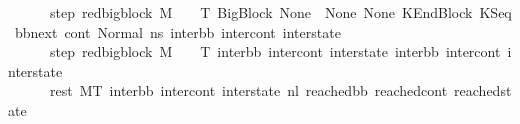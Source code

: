 \begin{isabellebody}
\ \ \ \ \ \ step{}{\isacharcolon}{\kern0pt}\ {\isachardoublequoteopen}{\isacharparenleft}{\kern0pt}red{\isacharunderscore}{\kern0pt}bigblock\ M\ {\isasymLambda}\ {\isasymGamma}\ {\isasymOmega}\ T\ {\isacharparenleft}{\kern0pt}BigBlock\ None\ {\isacharbrackleft}{\kern0pt}{\isacharbrackright}{\kern0pt}\ None\ None{\isacharcomma}{\kern0pt}\ KEndBlock\ {\isacharparenleft}{\kern0pt}KSeq\ bb{\isacharunderscore}{\kern0pt}next\ cont{}{\isacharparenright}{\kern0pt}{\isacharcomma}{\kern0pt}\ Normal\ ns{}{\isacharparenright}{\kern0pt}\ {\isacharparenleft}{\kern0pt}inter{\isacharunderscore}{\kern0pt}bb{\isacharcomma}{\kern0pt}\ inter{\isacharunderscore}{\kern0pt}cont{\isacharcomma}{\kern0pt}\ inter{\isacharunderscore}{\kern0pt}state{\isacharparenright}{\kern0pt}{\isacharparenright}{\kern0pt}{\isachardoublequoteclose}\ \ \isanewline
\ \ \ \ \ \ step{}{\isacharcolon}{\kern0pt}\ {\isachardoublequoteopen}{\isacharparenleft}{\kern0pt}red{\isacharunderscore}{\kern0pt}bigblock\ M\ {\isasymLambda}\ {\isasymGamma}\ {\isasymOmega}\ T\ {\isacharparenleft}{\kern0pt}inter{\isacharunderscore}{\kern0pt}bb{\isacharcomma}{\kern0pt}\ inter{\isacharunderscore}{\kern0pt}cont{\isacharcomma}{\kern0pt}\ inter{\isacharunderscore}{\kern0pt}state{\isacharparenright}{\kern0pt}\ {\isacharparenleft}{\kern0pt}inter{\isacharunderscore}{\kern0pt}bb{}{\isacharcomma}{\kern0pt}\ inter{\isacharunderscore}{\kern0pt}cont{}{\isacharcomma}{\kern0pt}\ inter{\isacharunderscore}{\kern0pt}state{}{\isacharparenright}{\kern0pt}{\isacharparenright}{\kern0pt}{\isachardoublequoteclose}\ \isanewline
\ \ \ \ \ \ rest{\isacharcolon}{\kern0pt}\ {\isachardoublequoteopen}M{\isacharcomma}{\kern0pt}{\isasymLambda}{\isacharcomma}{\kern0pt}{\isasymGamma}{\isacharcomma}{\kern0pt}{\isasymOmega}{\isacharcomma}{\kern0pt}T\ {\isasymturnstile}{\isacharparenleft}{\kern0pt}inter{\isacharunderscore}{\kern0pt}bb{}{\isacharcomma}{\kern0pt}\ inter{\isacharunderscore}{\kern0pt}cont{}{\isacharcomma}{\kern0pt}\ inter{\isacharunderscore}{\kern0pt}state{}{\isacharparenright}{\kern0pt}\ {\isacharminus}{\kern0pt}n{\isasymlongrightarrow}{\isacharcircum}{\kern0pt}l{}\ {\isacharparenleft}{\kern0pt}reached{\isacharunderscore}{\kern0pt}bb{\isacharcomma}{\kern0pt}\ reached{\isacharunderscore}{\kern0pt}cont{\isacharcomma}{\kern0pt}\ reached{\isacharunderscore}{\kern0pt}state{\isacharparenright}{\kern0pt}{\isachardoublequoteclose}\ \isanewline
\ \ \ \ \ \ \isamarkupfalse%

\end{isabellebody}
